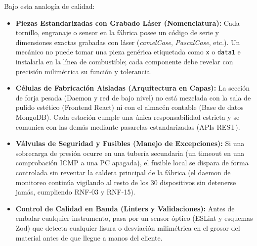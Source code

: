 \documentclass[12pt,a4paper]{report}
\begin{document}
Bajo esta analogía de calidad:
\begin{itemize}
  \item \textbf{Piezas Estandarizadas con Grabado Láser (Nomenclatura):} Cada tornillo, engranaje o sensor en la fábrica posee un código de serie y dimensiones exactas grabadas con láser (\textit{camelCase}, \textit{PascalCase}, etc.). Un mecánico no puede tomar una pieza genérica etiquetada como \texttt{x} o \texttt{data1} e instalarla en la línea de combustible; cada componente debe revelar con precisión milimétrica su función y tolerancia.
  \item \textbf{Células de Fabricación Aisladas (Arquitectura en Capas):} La sección de forja pesada (Daemon y red de bajo nivel) no está mezclada con la sala de pulido estético (Frontend React) ni con el almacén contable (Base de datos MongoDB). Cada estación cumple una única responsabilidad estricta y se comunica con las demás mediante pasarelas estandarizadas (APIs REST).
  \item \textbf{Válvulas de Seguridad y Fusibles (Manejo de Excepciones):} Si una sobrecarga de presión ocurre en una tubería secundaria (un timeout en una comprobación ICMP a una PC apagada), el fusible local se dispara de forma controlada sin reventar la caldera principal de la fábrica (el daemon de monitoreo continúa vigilando al resto de los 30 dispositivos sin detenerse jamás, cumpliendo RNF-03 y RNF-15).
  \item \textbf{Control de Calidad en Banda (Linters y Validaciones):} Antes de embalar cualquier instrumento, pasa por un sensor óptico (ESLint y esquemas Zod) que detecta cualquier fisura o desviación milimétrica en el grosor del material antes de que llegue a manos del cliente.
\end{itemize}
\end{document}
